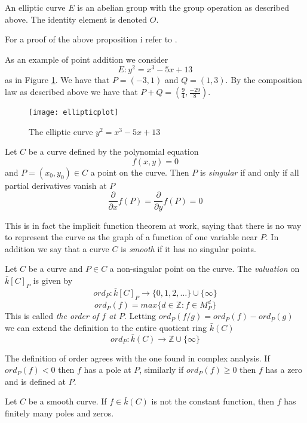 \begin{prop}
  An elliptic curve $E$ is an abelian group with the group operation as described above.
The identity element is denoted $O$.
\end{prop}
For a proof of the above proposition i refer to \cite{AEC}.

\begin{ex}
 As an example of point addition we consider
$$E: y^2 = x^3-5x+13$$
as in Figure \ref{fig1}. We have that $P=(-3,1)$ and $Q=(1,3)$. By the composition law
as described above we have that $P+Q=(\frac{9}{4}, \frac{-29}{8})$.
\end{ex}



\begin{figure}\label{fig1}
 \caption{The elliptic curve $y^2=x^3-5x+13$}
  \centering
  \texttt{[image: ellipticplot]}
\end{figure}

\begin{mydef}
 Let $C$ be a curve defined by the polynomial equation
$$f(x,y) = 0$$
and $P=(x_0,y_0) \in C$ a point on the curve. Then $P$ is \emph{singular} if and only if all
partial derivatives vanish at $P$
$$\frac{\partial}{\partial x}f(P) = \frac{\partial}{\partial y}f(P) = 0$$
\end{mydef}

This is in fact the implicit function theorem at work, saying that there is no way to
represent the curve as the graph of a function of one variable near $P$.
In addition we say that a curve $C$ is \emph{smooth} if it has no singular points.

\begin{mydef}
 Let $C$ be a curve and $P\in C$ a non-singular point on the curve. The \emph{valuation} on
$\bar{k}[C]_P$ is given by
$$ ord_P : \bar{k}[C]_P \rightarrow \{ 0, 1, 2, \ldots \} \cup \{ \infty \} $$
$$ ord_P(f) = max \{ d\in \mathbb{Z} : f\in M_P^d \} $$
This is called \emph{the order of $f$ at $P$}.
Letting $ord_P(f/g) = ord_P(f) - ord_P(g)$ we can extend the definition to the entire
quotient ring $\bar{k}(C)$
$$ ord_P: \bar{k}(C) \rightarrow \mathbb{Z}\cup \{\infty \} $$
\end{mydef}

The definition of order agrees with the one found in complex analysis.
If $ord_P(f) < 0$ then $f$ has a pole at $P$, similarly if $ord_P(f) \ge 0$ then $f$ 
has a zero and is defined at $P$.

\begin{prop}
 Let $C$ be a smooth curve. If $f\in \bar{k}(C)$ is not the constant function, then
$f$ has finitely many poles and zeros.
\label{prop:1}
\end{prop}

